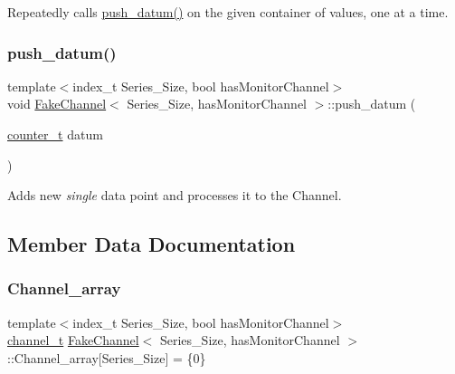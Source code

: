 Repeatedly calls {\ttfamily \hyperlink{classFakeChannel_ad40cc96be3b22a6d0111b9cc8f30ffcf}{push\+\_\+datum()}} on the given container of values, one at a time. 

\mbox{\label{classFakeChannel_ad40cc96be3b22a6d0111b9cc8f30ffcf}} 
\subsubsection{\texorpdfstring{push\+\_\+datum()}{push\_datum()}}
{\footnotesize\ttfamily template$<$index\+\_\+t Series\+\_\+\+Size, bool has\+Monitor\+Channel$>$ \\
void \hyperlink{classFakeChannel}{Fake\+Channel}$<$ Series\+\_\+\+Size, has\+Monitor\+Channel $>$\+::push\+\_\+datum (\begin{DoxyParamCaption}\item[{\hyperlink{types_8hpp_a22f279793847eba127de149437848c48}{counter\+\_\+t}}]{datum }\end{DoxyParamCaption})\hspace{0.3cm}{\ttfamily [inline]}}



Adds new {\itshape single} data point and processes it to the {\ttfamily Channel}. 



\subsection{Member Data Documentation}
\mbox{\label{classFakeChannel_a51f14eee081adbcd3db827b669e45749}} 
\subsubsection{\texorpdfstring{Channel\+\_\+array}{Channel\_array}}
{\footnotesize\ttfamily template$<$index\+\_\+t Series\+\_\+\+Size, bool has\+Monitor\+Channel$>$ \\
\hyperlink{types_8hpp_a9f8f935e7952f42d763385090e3404a5}{channel\+\_\+t} \hyperlink{classFakeChannel}{Fake\+Channel}$<$ Series\+\_\+\+Size, has\+Monitor\+Channel $>$\+::Channel\+\_\+array\mbox{[}Series\+\_\+\+Size\mbox{]} = \{0\}}



